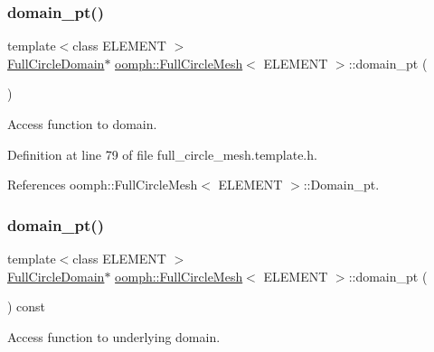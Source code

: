 \subsubsection{\texorpdfstring{domain\+\_\+pt()}{domain\_pt()}\hspace{0.1cm}{\footnotesize\ttfamily [1/2]}}
{\footnotesize\ttfamily template$<$class E\+L\+E\+M\+E\+NT $>$ \\
\hyperlink{classoomph_1_1FullCircleDomain}{Full\+Circle\+Domain}$\ast$ \hyperlink{classoomph_1_1FullCircleMesh}{oomph\+::\+Full\+Circle\+Mesh}$<$ E\+L\+E\+M\+E\+NT $>$\+::domain\+\_\+pt (\begin{DoxyParamCaption}{ }\end{DoxyParamCaption})\hspace{0.3cm}{\ttfamily [inline]}}



Access function to domain. 



Definition at line 79 of file full\+\_\+circle\+\_\+mesh.\+template.\+h.



References oomph\+::\+Full\+Circle\+Mesh$<$ E\+L\+E\+M\+E\+N\+T $>$\+::\+Domain\+\_\+pt.

\mbox{\label{classoomph_1_1FullCircleMesh_ae912045c32ae004812d61a58161e531f}} 
\subsubsection{\texorpdfstring{domain\+\_\+pt()}{domain\_pt()}\hspace{0.1cm}{\footnotesize\ttfamily [2/2]}}
{\footnotesize\ttfamily template$<$class E\+L\+E\+M\+E\+NT $>$ \\
\hyperlink{classoomph_1_1FullCircleDomain}{Full\+Circle\+Domain}$\ast$ \hyperlink{classoomph_1_1FullCircleMesh}{oomph\+::\+Full\+Circle\+Mesh}$<$ E\+L\+E\+M\+E\+NT $>$\+::domain\+\_\+pt (\begin{DoxyParamCaption}{ }\end{DoxyParamCaption}) const\hspace{0.3cm}{\ttfamily [inline]}}



Access function to underlying domain. 



